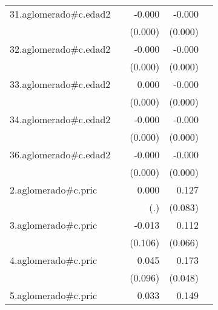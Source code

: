 {\begin{longtable}{l*{4}{D{.}{.}{-1}}}
\addlinespace
31.aglomerado#c.edad2&                     &      -0.000         &      -0.000\sym{**} &                     \\
            &                     &     (0.000)         &     (0.000)         &                     \\
\addlinespace
32.aglomerado#c.edad2&                     &      -0.000         &      -0.000\sym{***}&                     \\
            &                     &     (0.000)         &     (0.000)         &                     \\
\addlinespace
33.aglomerado#c.edad2&                     &       0.000         &      -0.000\sym{***}&                     \\
            &                     &     (0.000)         &     (0.000)         &                     \\
\addlinespace
34.aglomerado#c.edad2&                     &      -0.000         &      -0.000\sym{**} &                     \\
            &                     &     (0.000)         &     (0.000)         &                     \\
\addlinespace
36.aglomerado#c.edad2&                     &      -0.000         &      -0.000\sym{*}  &                     \\
            &                     &     (0.000)         &     (0.000)         &                     \\
\addlinespace
2.aglomerado#c.pric&                     &       0.000         &       0.127         &                     \\
            &                     &         (.)         &     (0.083)         &                     \\
\addlinespace
3.aglomerado#c.pric&                     &      -0.013         &       0.112         &                     \\
            &                     &     (0.106)         &     (0.066)         &                     \\
\addlinespace
4.aglomerado#c.pric&                     &       0.045         &       0.173\sym{***}&                     \\
            &                     &     (0.096)         &     (0.048)         &                     \\
\addlinespace
5.aglomerado#c.pric&                     &       0.033         &       0.149\sym{*}  &                     \\

\end{longtable}}
